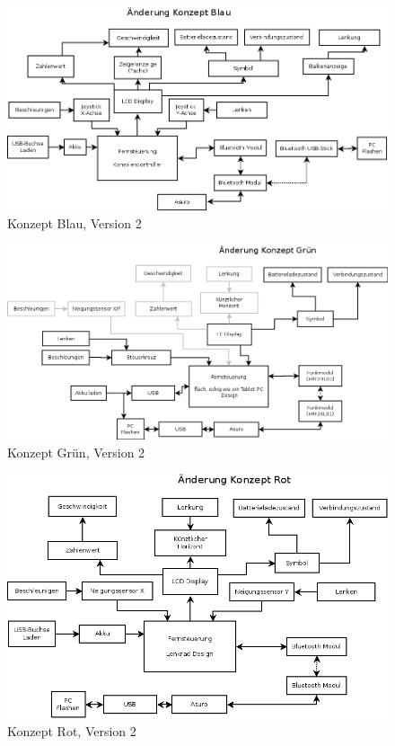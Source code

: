 \begin{figure}
	\centering
	\includegraphics[width=\textwidth]{konzepte_v2/Konzept_Blau.png}
	\caption{Konzept Blau, Version 2}
	\label{fig:blau_v2}
\end{figure}

\begin{figure}
	\centering
	\includegraphics[width=\textwidth]{konzepte_v2/Konzept_Gruen.png}
	\caption{Konzept Grün, Version 2}
	\label{fig:gruen_v2}
\end{figure}

\begin{figure}
	\centering
	\includegraphics[width=\textwidth]{konzepte_v2/Konzept_Rot.png}
	\caption{Konzept Rot, Version 2}
	\label{fig:rot_v2}
\end{figure}
